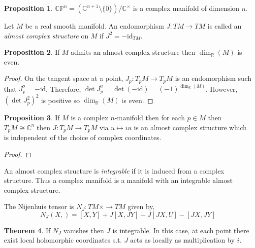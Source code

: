 \documentclass[12pt]{extarticle}
\newcommand{\R}{\mathbb{R}}
\newcommand{\C}{\mathbb{C}}
\newcommand{\id}{\mathrm{id}}
\theoremstyle{definition}
\newtheorem{theorem}{Theorem}[section]
\newtheorem{proposition}[theorem]{Proposition}
\newenvironment{definition}[1][Definition:]{\begin{trivlist}
\item[\hskip \labelsep {\bfseries #1}]}{\end{trivlist}}
\newcommand{\CP}{\mathbb{CP}}
\begin{document}
\begin{proposition}
$\CP^{n} = (\C^{n+1} \setminus \{0\}) / \C^\times$ is a complex manifold of dimension $n$. 
\end{proposition}

\begin{definition}
Let $M$ be a real smooth manifold. An endomorphism $J : TM \to TM$ is called an \textit{almost complex structure} on $M$ if $J^2 = - \id_{TM}$. 
\end{definition}

\begin{proposition}
If $M$ admits an almost complex structure then $\dim_{\R}(M)$ is even.
\end{proposition}

\begin{proof}
On the tangent space at a point, $J_p : T_p M \to T_p M$ is an endomorphism such that $J_p^2 = - \id$. Therefore, $\det{J_p^2} = \det{(-\id)} = (-1)^{\dim_{\R}(M)}$. However, $(\det{J_p^2})^2$ is positive so $\dim_{\R}(M)$ is even.   
\end{proof}

\begin{proposition}
If $M$ is a complex $n$-manifold then for each $p \in M$ then $T_p M \cong \C^{n}$ then $J : T_p M \to T_p M$ via $u \mapsto i u$ is an almost complex structure which is independent of the choice of complex coordinates.
\end{proposition}

\begin{proof}

\end{proof}

\begin{definition}
An almost complex structure is \textit{integrable} if it is induced from a complex structure. Thus a complex manifold is a manifold with an integrable almost complex structure. 
\end{definition}

\begin{definition} 
The Nijenhuis tensor is $N_J : TM \times \to TM$ given by,
\[ N_J(X, ) = [X, Y] + J[X, JY] + J[JX, U] - [JX, JY] \]
\end{definition}

\begin{theorem}
If $N_J$ vanishes then $J$ is integrable. In this case, at each point there exist local holomorphic coordinates s.t. $J$ acts as locally as multiplication by $i$. 
\end{theorem}
\end{document}
